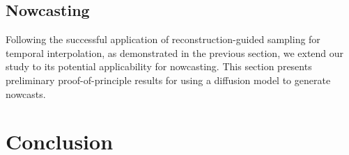 \documentclass[ oneside,%
                    author={George Herbert},
                    degree={MSci},
                     title={Diffusion Models for Time-Evolving Precipitation Fields},
                  subtitle={}]{dissertation}
\begin{document}
\section{Nowcasting}
\label{sec:results_nowcasting}

Following the successful application of reconstruction-guided sampling for temporal interpolation, as demonstrated in the previous section, we extend our study to its potential applicability for nowcasting. This section presents preliminary proof-of-principle results for using a diffusion model to generate nowcasts.






\chapter{Conclusion}
\label{chap:conclusion}

\end{document}
